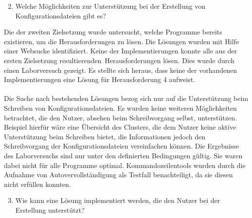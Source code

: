 \begin{enumerate}
    \setcounter{enumi}{1}
    \item Welche Möglichkeiten zur Unterstützung bei der Erstellung von Konfigurationsdateien gibt es?
\end{enumerate}

Die der zweiten Zielsetzung wurde untersucht, welche Programme bereits existieren, um die Herausforderungen zu lösen.
Die Lösungen wurden mit Hilfe einer Websuche identifiziert.
Keine der Implementierungen konnte alle aus der ersten Zielsetzung resultierenden\ Herausforderungen lösen.
Dies wurde durch einen Laborversuch gezeigt.
Es stellte sich heraus, dass keine der vorhandenen Implementierungen eine Lösung für Herausforderung 4 aufweist.
\\\\
Die Suche nach bestehenden Lösungen bezog sich nur auf die Unterstützung beim Schreiben von Konfigurationsdateien.
Es wurden keine weiteren Möglichkeiten betrachtet, die den Nutzer, absehen beim Schreibvorgang selbst, unterstützen.
Beispiel hierfür wäre eine Übersicht des Clusters, die dem Nutzer keine aktive Unterstützung beim Schreiben bietet,
die Informationen jedoch den Schreibvorgang der Konfigurationsdateien vereinfachen können.
Die Ergebnisse des Laborversuchs sind nur unter den definierten Bedingungen gültig.
Sie waren dabei nicht für alle Programme optimal. Kommandozeilentools wurden durch die Aufnahme von Autovervollständigung als Testfall benachteiligt,
da sie diesen nicht erfüllen konnten.

\begin{enumerate}
    \setcounter{enumi}{2}
    \item Wie kann eine Lösung implementiert werden, die den Nutzer bei der Erstellung unterstützt?
\end{enumerate}

